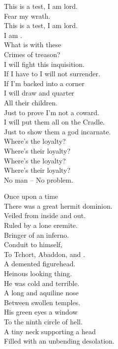 This is a test, I am lord. \\
Fear my wrath. \\
This is a test, I am lord. \\
I am . \\

What is with these \\
Crimes of treason? \\
I will fight this inquisition. \\
If I have to I will not surrender. \\
If I'm backed into a corner \\
I will draw and quarter \\
All their children. \\
Just to prove I'm not a coward. \\
I will put them all on the  Cradle. \\
Just to show them a god incarnate. \\

Where's the loyalty? \\
Where's their loyalty? \\
Where's the loyalty? \\
Where's their loyalty? \\
No man -- No problem. \\




Once upon a time \\
There was a great hermit dominion. \\
Veiled from inside and out. \\
Ruled by a lone eremite. \\
Bringer of an inferno. \\
Conduit to  himself, \\
To Tchort, Abaddon, and . \\
A demented figurehead. \\

Heinous looking thing. \\
He was cold and terrible. \\
A long and aquiline nose \\
Between swollen temples. \\
His green eyes a window \\
To the ninth circle of hell. \\
A tiny neck supporting a head \\
Filled with an unbending desolation. \\

